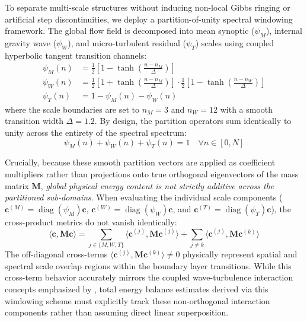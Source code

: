 \documentclass[11pt,a4paper]{article}
\begin{document}
To separate multi-scale structures without inducing non-local Gibbs ringing or artificial step discontinuities, we deploy a partition-of-unity spectral windowing framework. The global flow field is decomposed into mean synoptic ($\psi_M$), internal gravity wave ($\psi_W$), and micro-turbulent residual ($\psi_T$) scales using coupled hyperbolic tangent transition channels:
\begin{align}
  \psi_M(n) &= \frac{1}{2}\left[1 - \tanh\left(\frac{n - n_M}{\Delta}\right)\right] \label{eq:psi_m_def} \\
  \psi_W(n) &= \frac{1}{2}\left[1 + \tanh\left(\frac{n - n_M}{\Delta}\right)\right] \cdot \frac{1}{2}\left[1 - \tanh\left(\frac{n - n_W}{\Delta}\right)\right] \label{eq:psi_w_def} \\
  \psi_T(n) &= 1 - \psi_M(n) - \psi_W(n) \label{eq:psi_t_def}
\end{align}
where the scale boundaries are set to $n_M = 3$ and $n_W = 12$ with a smooth transition width $\Delta = 1.2$. By design, the partition operators sum identically to unity across the entirety of the spectral spectrum:
\begin{equation}
\psi_M(n) + \psi_W(n) + \psi_T(n) = 1 \quad \forall n \in [0, N]
\label{eq:partition_unity}
\end{equation}

Crucially, because these smooth partition vectors are applied as coefficient multipliers rather than projections onto true orthogonal eigenvectors of the mass matrix $\mathbf{M}$, \emph{global physical energy content is not strictly additive across the partitioned sub-domains}. When evaluating the individual scale components ($\mathbf{c}^{(M)} = \operatorname{diag}(\psi_M)\mathbf{c}$, $\mathbf{c}^{(W)} = \operatorname{diag}(\psi_W)\mathbf{c}$, and $\mathbf{c}^{(T)} = \operatorname{diag}(\psi_T)\mathbf{c}$), the cross-product metrics do not vanish identically:
\begin{equation}
\langle \mathbf{c}, \mathbf{M} \mathbf{c} \rangle = \sum_{j \in \{M,W,T\}} \langle \mathbf{c}^{(j)}, \mathbf{M} \mathbf{c}^{(j)} \rangle + \sum_{j \neq k} \langle \mathbf{c}^{(j)}, \mathbf{M} \mathbf{c}^{(k)} \rangle
\label{eq:energy_overlap}
\end{equation}
The off-diagonal cross-terms $\langle \mathbf{c}^{(j)}, \mathbf{M} \mathbf{c}^{(k)} \rangle \neq 0$ physically represent spatial and spectral scale overlap regions within the boundary layer transitions. While this cross-term behavior accurately mirrors the coupled wave-turbulence interaction concepts emphasized by \citet{Sun2015}, total energy balance estimates derived via this windowing scheme must explicitly track these non-orthogonal interaction components rather than assuming direct linear superposition.
\end{document}
